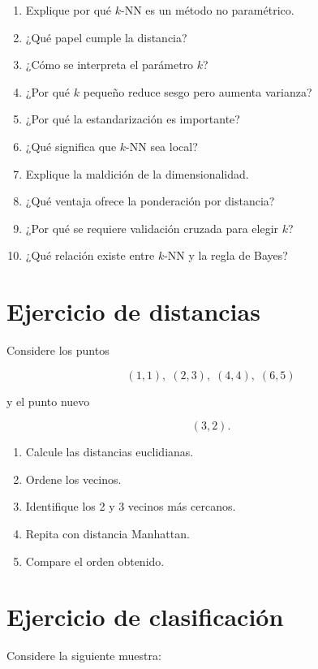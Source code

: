 \documentclass[
  spanish,
  11pt,
  letterpaper,
  DIV=11,
  numbers=noendperiod]{scrreprt}
\providecommand{\tightlist}{%
  \setlength{\itemsep}{0pt}\setlength{\parskip}{0pt}}
\theoremstyle{definition}
\theoremstyle{plain}
\theoremstyle{definition}
\theoremstyle{remark}
\begin{document}
\begin{enumerate}
\def\labelenumi{\arabic{enumi}.}
\tightlist
\item
  Explique por qué \(k\)-NN es un método no paramétrico.
\item
  ¿Qué papel cumple la distancia?
\item
  ¿Cómo se interpreta el parámetro \(k\)?
\item
  ¿Por qué \(k\) pequeño reduce sesgo pero aumenta varianza?
\item
  ¿Por qué la estandarización es importante?
\item
  ¿Qué significa que \(k\)-NN sea local?
\item
  Explique la maldición de la dimensionalidad.
\item
  ¿Qué ventaja ofrece la ponderación por distancia?
\item
  ¿Por qué se requiere validación cruzada para elegir \(k\)?
\item
  ¿Qué relación existe entre \(k\)-NN y la regla de Bayes?
\end{enumerate}

\section{Ejercicio de distancias}\label{ejercicio-de-distancias}

Considere los puntos

\[
(1,1),\;(2,3),\;(4,4),\;(6,5)
\]

y el punto nuevo

\[
(3,2).
\]

\begin{enumerate}
\def\labelenumi{\arabic{enumi}.}
\tightlist
\item
  Calcule las distancias euclidianas.
\item
  Ordene los vecinos.
\item
  Identifique los 2 y 3 vecinos más cercanos.
\item
  Repita con distancia Manhattan.
\item
  Compare el orden obtenido.
\end{enumerate}

\section{Ejercicio de
clasificación}\label{ejercicio-de-clasificaciuxf3n-2}

Considere la siguiente muestra:
\end{document}
